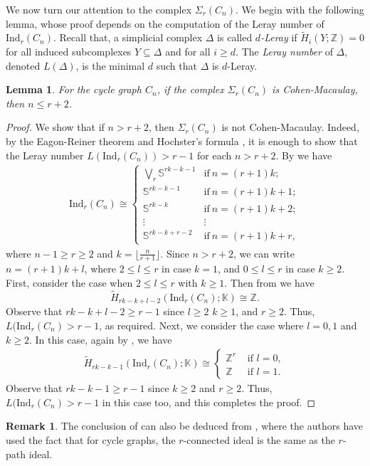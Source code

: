 \documentclass[12pt,reqno]{amsart}
\newtheorem{lemma}[proposition]{Lemma}
\theoremstyle{definition}
\newtheorem{remark}[proposition]{Remark}
\def\Ind{\mathrm{Ind}}
\begin{document}
We now turn our attention to the complex $\Sigma_r(C_n)$. We begin with the following lemma, whose proof depends on the computation of the Leray number of $\Ind_r(C_n)$. Recall that, a simplicial complex $\Delta$ is called {\it $d$-Leray} if $\tilde{H}_i(Y;\mathbb{Z})=0$ for all induced subcomplexes $Y \subseteq \Delta$ and for all $i\geq d$. The {\it Leray number} of $\Delta$, denoted $L(\Delta)$, is the minimal $d$ such that $\Delta$ is $d$-Leray.
    \begin{lemma}\label{cycle lemma}
        For the cycle graph $C_n$, if the complex $\Sigma_r(C_n)$ is Cohen-Macaulay, then $n\le r+2$.
    \end{lemma}
    \begin{proof}
       We show that if $n>r+2$, then $\Sigma_r(C_n)$ is not Cohen-Macaulay. Indeed, by the Eagon-Reiner theorem \cite[Theorem 3]{EagonReiner1998} and Hochster's formula \cite{Hochster77}, it is enough to show that the Leray number $L(\Ind_{r}(C_n))>r-1$ for each $n>r+2$. By \cite[Theorem 4.6]{HICH} we have 
       \begin{align}\label{eq3546}
       \Ind_{r}(C_n) \cong
\begin{cases} 
     \displaystyle \bigvee_{r}\mathbb{S}^{rk-k-1} & \mathrm{if\ } n =(r+1)k;\\
     \mathbb{S}^{rk-k-1} & \mathrm{if\ } n = (r+1)k+ 1;\\
     \mathbb{S}^{rk-k} & \mathrm{if\ } n = (r+1)k+2;\\
     \vdots & \vdots\\
     \mathbb{S}^{rk-k+r-2} & \mathrm{if\ } n = (r+1)k+r,
   \end{cases}
\end{align}
where $n-1\geq r \geq 2$ and $k=\lfloor\frac{n}{r+1}\rfloor$. Since $n>r+2$, we can write $n=(r+1)k+l$, where $2\le l\le r$ in case $k=1$, and $0\le l\le r$ in case $k\ge 2$. First, consider the case when $2\le l\le r$ with $k\ge 1$. Then from  we have 
\[
\tilde{H}_{rk-k+l-2}(\Ind_{r}(C_n);\mathbb{K}) \cong \mathbb Z.
\] 
Observe that $rk-k+l-2\ge r-1$ since $l\ge 2$ $k\ge 1$, and $r\ge 2$. Thus, $L(\Ind_r(C_n)>r-1$, as required. Next, we consider the case where $l=0,1$ and $k\ge 2$. In this case, again by , we have
\begin{align*}
\tilde{H}_{rk-k-1}(\Ind_{r}(C_n);\mathbb{K}) \cong \begin{cases}
    \mathbb Z^r &\text{ if }l=0,\\
    \mathbb Z &\text{ if }l=1.
\end{cases} 
\end{align*}
Observe that $rk-k-1\ge r-1$ since $k\ge 2$ and $r\ge 2$. Thus, $L(\Ind_r(C_n)>r-1$ in this case too, and this completes the proof.
    \end{proof}
    \begin{remark}
        The conclusion of  can also be deduced from \cite[Proposition 5.3]{LQCG}, where the authors have used the fact that for cycle graphs, the $r$-connected ideal is the same as the $r$-path ideal.
    \end{remark}
        
\end{document}
